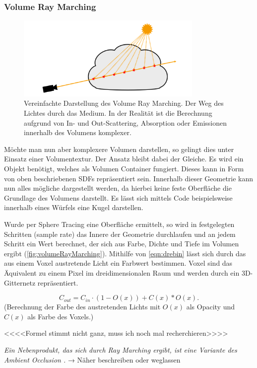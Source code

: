 



\subsubsection{Volume Ray Marching}

\begin{figure}[hb]
	\centering
	\includegraphics[width=0.80\textwidth]{Grafiken/Basics/Volume/Volume_RayMarching.png}
	\begin{footnotesize}
		\caption{Vereinfachte Darstellung des Volume Ray Marching. Der Weg des Lichtes durch
			das Medium. In der Realität ist die Berechnung aufgrund von In- und Out-Scattering, Absorption oder Emissionen innerhalb des
			Volumens komplexer.}
		\label{fig:volumeRayMarching}
	\end{footnotesize}
\end{figure}


Möchte man nun aber komplexere Volumen darstellen, so gelingt dies unter Einsatz einer Volumentextur. Der Ansatz bleibt dabei der Gleiche.
Es wird ein Objekt benötigt, welches als Volumen Container fungiert. Dieses kann in Form von oben beschriebenen SDFs repräsentiert sein.
Innerhalb dieser Geometrie kann nun alles mögliche dargestellt werden, da hierbei keine feste Oberfläche die Grundlage des
Volumens darstellt. Es lässt sich mittels Code beispielsweise innerhalb eines Würfels eine Kugel darstellen.


Wurde per Sphere Tracing eine Oberfläche ermittelt, so wird in festgelegten Schritten (sample rate) das Innere der Geometrie durchlaufen
und an jedem Schritt ein Wert berechnet, der sich aus Farbe, Dichte und Tiefe im Volumen ergibt (\autoref{fig:volumeRayMarching}).
Mithilfe von \autoref{eqn:drebin} \parencite{Drebin1988} lässt sich durch das aus einem Voxel austretende Licht ein Farbwert bestimmen.
Voxel sind das Äquivalent zu einem Pixel im dreidimensionalen Raum und werden durch ein 3D-Gitternetz repräsentiert.

\begin{equation}
	\label{eqn:drebin}
	C_{out} = C_{in} \cdot (1 - O(x)) + C(x) * O(x).
\end{equation}
(Berechnung der Farbe des austretenden Lichts mit $O(x)$ als Opacity und $C(x)$ als Farbe des Voxels.)


<<<<Formel stimmt nicht ganz, muss ich noch mal recherchieren>>>>

\textit{
	Ein Nebenprodukt, das sich durch Ray Marching ergibt, ist eine Variante des Ambient Occlusion \parencite{Evans2006}.
}
→ Näher beschreiben oder weglassen
